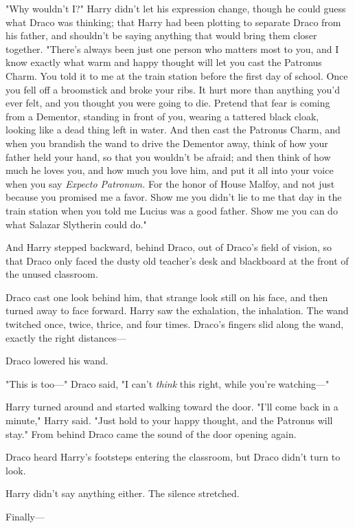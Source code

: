 "Why wouldn't I?" Harry didn't let his expression change, though he could guess
what Draco was thinking; that Harry had been plotting to separate Draco from
his father, and shouldn't be saying anything that would bring them closer
together. "There's always been just one person who matters most to you, and I
know exactly what warm and happy thought will let you cast the Patronus Charm.
You told it to me at the train station before the first day of school. Once you
fell off a broomstick and broke your ribs. It hurt more than anything you'd
ever felt, and you thought you were going to die. Pretend that fear is coming
from a Dementor, standing in front of you, wearing a tattered black cloak,
looking like a dead thing left in water. And then cast the Patronus Charm, and
when you brandish the wand to drive the Dementor away, think of how your father
held your hand, so that you wouldn't be afraid; and then think of how much he
loves you, and how much you love him, and put it all into your voice when you
say \emph{Expecto Patronum.} For the honor of House Malfoy, and not just
because you promised me a favor. Show me you didn't lie to me that day in the
train station when you told me Lucius was a good father. Show me you can do
what Salazar Slytherin could do."

And Harry stepped backward, behind Draco, out of Draco's field of vision, so
that Draco only faced the dusty old teacher's desk and blackboard at the front
of the unused classroom.

Draco cast one look behind him, that strange look still on his face, and then
turned away to face forward. Harry saw the exhalation, the inhalation. The wand
twitched once, twice, thrice, and four times. Draco's fingers slid along the
wand, exactly the right distances---

Draco lowered his wand.

"This is too\mbox{---}" Draco said, "I can't \emph{think} this right, while you're
watching\mbox{---}"

Harry turned around and started walking toward the door. "I'll come back in a
minute," Harry said. "Just hold to your happy thought, and the Patronus will
stay."
\sbreak
From behind Draco came the sound of the door opening again.

Draco heard Harry's footsteps entering the classroom, but Draco didn't turn to
look.

Harry didn't say anything either. The silence stretched.

Finally---

